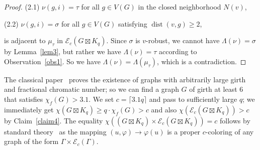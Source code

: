 \documentclass{amsart}
\theoremstyle{definition}
\theoremstyle{remark}
\numberwithin{equation}{section}
\def\E{\mathcal{E}}
\def\E{\mathcal{E}}
\begin{document}
\begin{proof}
\smallskip

\noindent (2.1) $\nu(g,i)=\tau$ for all $g\in V(G)$ in the closed neighborhood $N(v)$,

\noindent (2.2) $\nu(g,i)=\sigma$ for all $g\in V(G)$ satisfying $\operatorname{dist}(v,g)\geqslant 2$,

\smallskip 

\noindent is adjacent to $\mu_\tau$ in $\E_c(G\boxtimes K_q)$. Since $\sigma$ is $v$-robust, we cannot have $\Lambda(\nu)=\sigma$ by Lemma~\ref{lem3}, but rather we have $\Lambda(\nu)=\tau$ according to Observation~\ref{obs1}. So we have $\Lambda(\nu)=\Lambda(\mu_\tau)$, which is a contradiction.
\end{proof}

The classical paper~\cite{Erd} proves the existence of graphs with arbitrarily large girth and fractional chromatic number; so we can find a graph $G$ of girth at least $6$ that satisfies $\chi_f(G)>3.1$. We set $c=\lceil 3.1q\rceil$ and pass to sufficiently large $q$; we immediately get $\chi(G\boxtimes K_q)\geqslant q\cdot\chi_f(G)>c$ and also $\chi\left(\E_c(G\boxtimes K_q)\right)>c$ by Claim~\ref{claim4}. The equality $\chi\left((G\boxtimes K_q)\times \E_c(G\boxtimes K_q)\right)=c$ follows by standard theory~\cite{EZS} as the mapping $(u,\varphi)\to\varphi(u)$ is a proper $c$-coloring of any graph of the form $\Gamma\times \E_c(\Gamma)$.
\end{document}
